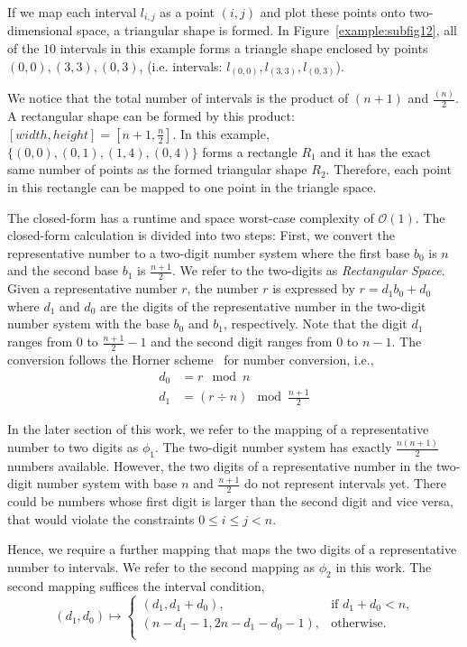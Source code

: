 \documentclass[AMA,LATO1COL]{WileyNJD-v2}
\newcommand\bigo{\mathcal O}
\begin{document}
If we map each interval $l_{i,j}$ as a point $(i,j)$ and plot these
points onto two-dimensional space, a triangular shape is formed. In
Figure~\ref{example:subfig12}, all of the $10$ intervals in this
example forms a triangle shape enclosed by points
${(0,0),(3,3),(0,3)}$, (i.e. intervals:
${l_{(0,0)},l_{(3,3)},l_{(0,3)}}$).

We notice that the total number of intervals is the product of $(n+1)$
and ${\frac{(n)}{2}}$. A rectangular shape can be formed by this
product: $[width,height]=[n+1,{\frac{n}{2}}]$. In this example,
$\{{(0,0)},{(0,1)},{(1,4)},{(0,4)}\}$ forms a rectangle $R_1$ and it
has the exact same number of points as the formed triangular shape
$R_2$. Therefore, each point in this rectangle can be mapped to one
point in the triangle space.

The closed-form has a runtime and space worst-case complexity of
$\bigo(1)$. The closed-form calculation is divided into two steps:
First, we convert the representative number to a two-digit number
system where the first base $b_0$ is $n$ and the second base $b_1$ is
$\frac{n+1}{2}$. We refer to the two-digits as \emph{Rectangular
  Space}. Given a representative number $r$, the number $r$ is
expressed by $r = d_1 b_0 + d_0$ where $d_1$ and $d_0$ are the digits
of the representative number in the two-digit number system with the
base $b_0$ and $b_1$, respectively. Note that the digit $d_1$ ranges
from $0$ to $\frac{n+1}{2}-1$ and the second digit ranges from $0$ to
$n-1$.  The conversion follows the Horner scheme~\cite{horner} for
number conversion, i.e.,
\begin{align*}
  d_0 &= r\mod n \\
  d_1 &= (r \div n) \mod \frac{n+1}{2}
\end{align*}

In the later section of this work, we refer to the mapping of a
representative number to two digits as $\phi_1$.  The two-digit number
system has exactly $\frac{n(n+1)}{2}$ numbers available. However, the
two digits of a representative number in the two-digit number system
with base $n$ and $\frac{n+1}{2}$ do not represent intervals
yet. There could be numbers whose first digit is larger than the
second digit and vice versa, that would violate the constraints $0
\leq i \leq j < n$.


Hence, we require a further mapping that maps the two digits of a
representative number to intervals.  We refer to the second mapping as
$\phi_2$ in this work. The second mapping suffices the interval
condition,
\begin{equation*}
(d_1, d_0) \mapsto
\begin{cases}
(d_1, d_1 + d_0), & \mbox{if $d_1 + d_0 < n$,} \\
(n - d_1 - 1, 2 n - d_1 - d_0 -1), & \mbox{otherwise.}\\
\end{cases}
\end{equation*}
\end{document}
